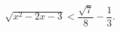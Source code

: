 \begin{ex}[type=inequality]
	\begin{condition}
		$\sqrt{x^2 - 2x - 3}<\dfrac{\sqrt{7}}{8}- \dfrac{1}{3} .$
	\end{condition}
\end{ex}